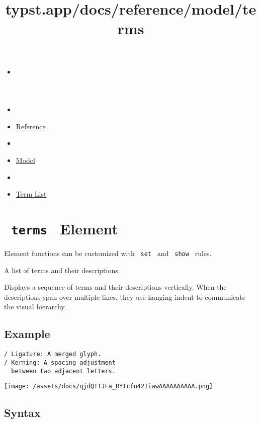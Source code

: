 \title{typst.app/docs/reference/model/terms}

\begin{itemize}
\tightlist
\item
  \href{/docs}{}
\item
  
\item
  \href{/docs/reference/}{Reference}
\item
  
\item
  \href{/docs/reference/model/}{Model}
\item
  
\item
  \href{/docs/reference/model/terms/}{Term List}
\end{itemize}

\section{\texorpdfstring{\texttt{\ terms\ } {{ Element
}}}{ terms   Element }}\label{summary}

\label{element-tooltip}
Element functions can be customized with \texttt{\ set\ } and
\texttt{\ show\ } rules.

A list of terms and their descriptions.

Displays a sequence of terms and their descriptions vertically. When the
descriptions span over multiple lines, they use hanging indent to
communicate the visual hierarchy.

\subsection{Example}\label{example}

\begin{verbatim}
/ Ligature: A merged glyph.
/ Kerning: A spacing adjustment
  between two adjacent letters.
\end{verbatim}

\texttt{[image: /assets/docs/qjdQTTJFa\_RYtcfu42IiawAAAAAAAAAA.png]}

\subsection{Syntax}\label{syntax}

